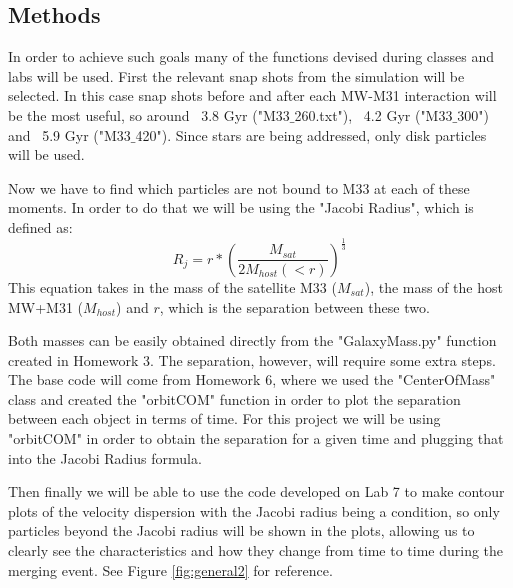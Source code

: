 \documentclass[linenumbers,trackchanges]{aastex7}
\begin{document}
\subsection{Methods}

In order to achieve such goals many of the functions devised during classes and labs will be used. First the relevant snap shots from the simulation will be selected. In this case snap shots before and after each MW-M31 interaction will be the most useful, so around ~3.8 Gyr ("M33$\_$260.txt"), ~4.2 Gyr ("M33$\_$300") and ~5.9 Gyr ({"M33$\_$420"}). Since stars are being addressed, only disk particles will be used.

Now we have to find which particles are not bound to M33 at each of these moments. In order to do that we will be using the "Jacobi Radius", which is defined as:
\begin{equation}
    R_j = r*{(\frac{M_{sat}}{2M_{host}(<r)})}^{\frac{1}{3}}
\end{equation}
This equation takes in the mass of the satellite M33 ($M_{sat}$), the mass of the host MW+M31 ($M_{host}$) and $r$, which is the separation between these two.

Both masses can be easily obtained directly from the "GalaxyMass.py" function created in Homework 3. The separation, however, will require some extra steps. The base code will come from Homework 6, where we used the "CenterOfMass" class and created the "orbitCOM" function in order to plot the separation between each object in terms of time. For this project we will be using "orbitCOM" in order to obtain the separation for a given time and plugging that into the Jacobi Radius formula.

Then finally we will be able to use the code developed on Lab 7 to make contour plots of the velocity dispersion with the Jacobi radius being a condition, so only particles beyond the Jacobi radius will be shown in the plots, allowing us to clearly see the characteristics and how they change from time to time during the merging event. See Figure \ref{fig:general2} for reference.
\begin{figure*}[ht!]
\caption{Diagram illustrating the steps that need to be taken in order to obtain velocity dispersion and gradient plots of particles located beyond the Jacobi radius (No longer bound by M33). In blue we can see more detailed explanations for how each function developed during an assignment will be used.
\label{fig:general2}}
\end{figure*}
\end{document}
